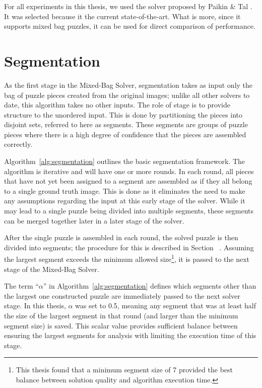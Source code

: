 For all experiments in this thesis, we used the solver proposed by Paikin \& Tal \cite{paikin2015}.  It was selected because it the current state-of-the-art.  What is more, since it supports mixed bag puzzles, it can be used for direct comparison of performance.

\section{Segmentation}\label{sec:Segmentation}

As the first stage in the Mixed-Bag Solver, segmentation takes as input only the bag of puzzle pieces created from the original images; unlike all other solvers to date, this algorithm takes no other inputs.  The role of stage is to provide structure to the unordered input.  This is done by partitioning the pieces into disjoint sets, referred to here as segments.  These segments are groups of puzzle pieces where there is a high degree of confidence that the pieces are assembled correctly.

Algorithm~\ref{alg:segmentation} outlines the basic segmentation framework.  The algorithm is iterative and will have one or more rounds.  In each round, all pieces that have not yet been assigned to a segment are assembled as if they all belong to a single ground truth image.  This is done as it eliminates the need to make any assumptions regarding the input at this early stage of the solver.  While it may lead to a single puzzle being divided into multiple segments, these segments can be merged together later in a later stage of the solver.

After the single puzzle is assembled in each round, the solved puzzle is then divided into segments; the procedure for this is described in Section~ \label{sec:segmentPuzzle}.  Assuming the largest segment exceeds the minimum allowed size\footnote{This thesis found that a minimum segment size of 7 provided the best balance between solution quality and algorithm execution time.}, it is passed to the next stage of the Mixed-Bag Solver.  

The term ``\textit{$\alpha$}'' in Algorithm~\ref{alg:segmentation} defines which segments other than the largest one constructed puzzle are immediately passed to the next solver stage.  In this thesis, \textit{$\alpha$} was set to 0.5, meaning any segment that was at least half the size of the largest segment in that round (and larger than the minimum segment size) is saved.  This scalar value provides sufficient balance between ensuring the largest segments for analysis with limiting the execution time of this stage.

